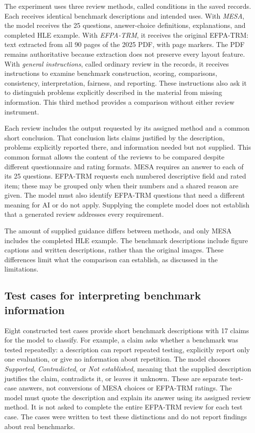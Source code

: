 \documentclass[10pt,conference]{IEEEtran}
\begin{document}
The experiment uses three review methods, called conditions in the saved records. Each receives identical benchmark descriptions and intended uses. With \emph{MESA}, the model receives the 25 questions, answer-choice definitions, explanations, and completed HLE example. With \emph{EFPA-TRM}, it receives the original EFPA-TRM: text extracted from all 90 pages of the 2025 PDF, with page markers. The PDF remains authoritative because extraction does not preserve every layout feature. With \emph{general instructions}, called ordinary review in the records, it receives instructions to examine benchmark construction, scoring, comparisons, consistency, interpretation, fairness, and reporting. These instructions also ask it to distinguish problems explicitly described in the material from missing information. This third method provides a comparison without either review instrument.

Each review includes the output requested by its assigned method and a common short conclusion. That conclusion lists claims justified by the description, problems explicitly reported there, and information needed but not supplied. This common format allows the content of the reviews to be compared despite different questionnaire and rating formats. MESA requires an answer to each of its 25 questions. EFPA-TRM requests each numbered descriptive field and rated item; these may be grouped only when their numbers and a shared reason are given. The model must also identify EFPA-TRM questions that need a different meaning for AI or do not apply. Supplying the complete model does not establish that a generated review addresses every requirement.

The amount of supplied guidance differs between methods, and only MESA includes the completed HLE example. The benchmark descriptions include figure captions and written descriptions, rather than the original images. These differences limit what the comparison can establish, as discussed in the limitations.

\subsection{Test cases for interpreting benchmark information}
Eight constructed test cases provide short benchmark descriptions with 17 claims for the model to classify. For example, a claim asks whether a benchmark was tested repeatedly: a description can report repeated testing, explicitly report only one evaluation, or give no information about repetition. The model chooses \emph{Supported}, \emph{Contradicted}, or \emph{Not established}, meaning that the supplied description justifies the claim, contradicts it, or leaves it unknown. These are separate test-case answers, not conversions of MESA choices or EFPA-TRM ratings. The model must quote the description and explain its answer using its assigned review method. It is not asked to complete the entire EFPA-TRM review for each test case. The cases were written to test these distinctions and do not report findings about real benchmarks.
\end{document}
